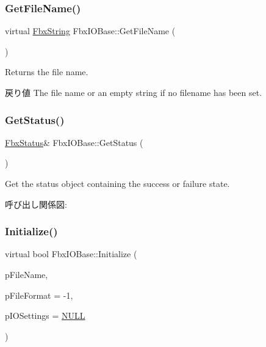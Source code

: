 \subsubsection{\texorpdfstring{Get\+File\+Name()}{GetFileName()}}
{\footnotesize\ttfamily virtual \hyperlink{class_fbx_string}{Fbx\+String} Fbx\+I\+O\+Base\+::\+Get\+File\+Name (\begin{DoxyParamCaption}{ }\end{DoxyParamCaption})\hspace{0.3cm}{\ttfamily [virtual]}}

Returns the file name. \begin{DoxyReturn}{戻り値}
The file name or an empty string if no filename has been set. 
\end{DoxyReturn}
\mbox{\label{class_fbx_i_o_base_a078e47a99b119278ca3ee639e2da5b6d}} 
\subsubsection{\texorpdfstring{Get\+Status()}{GetStatus()}}
{\footnotesize\ttfamily \hyperlink{class_fbx_status}{Fbx\+Status}\& Fbx\+I\+O\+Base\+::\+Get\+Status (\begin{DoxyParamCaption}{ }\end{DoxyParamCaption})}



Get the status object containing the success or failure state. 

呼び出し関係図\+:
\mbox{\label{class_fbx_i_o_base_a01d70175d09a1e791e2ce38a9ae3c265}} 
\subsubsection{\texorpdfstring{Initialize()}{Initialize()}}
{\footnotesize\ttfamily virtual bool Fbx\+I\+O\+Base\+::\+Initialize (\begin{DoxyParamCaption}\item[{const char $\ast$}]{p\+File\+Name,  }\item[{int}]{p\+File\+Format = {\ttfamily -\/1},  }\item[{\hyperlink{class_fbx_i_o_settings}{Fbx\+I\+O\+Settings} $\ast$}]{p\+I\+O\+Settings = {\ttfamily \hyperlink{fbxarch_8h_a070d2ce7b6bb7e5c05602aa8c308d0c4}{N\+U\+LL}} }\end{DoxyParamCaption})\hspace{0.3cm}{\ttfamily [virtual]}}


